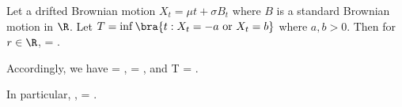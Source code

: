 \begin{theorem}\label{thm:drifted_brownian_motion_double_barriers_hitting_time_mgf}
Let a drifted Brownian motion $X_t = \mu t + \sigma B_t$ where $B$ is a standard Brownian motion in $\R$. Let $T = \inf\bra{t: X_t = -a \text{ or } X_t = b }$ where $a,b>0$. Then for $r\in \R$,
\be
\E{} = .
\ee

Accordingly, we have
\be
\pro{} = ,\qquad \pro{} =  ,
\ee
and
\be
\E T = .
\ee

In particular,
\be
\E{} ,
\ee
\be
\E{} = .
\ee
\end{theorem}

